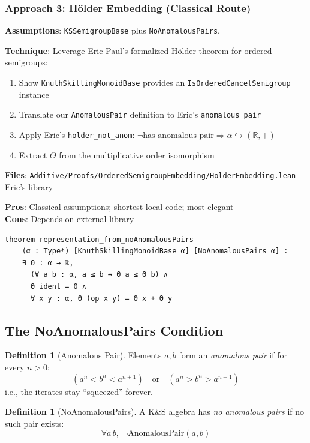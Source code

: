 \documentclass[11pt]{article}
\theoremstyle{definition}
\newtheorem{definition}[theorem]{Definition}
\theoremstyle{remark}
\begin{document}
\subsubsection{Approach 3: H\"older Embedding (Classical Route)}

\textbf{Assumptions}: \texttt{KSSemigroupBase} plus \texttt{NoAnomalousPairs}.

\textbf{Technique}: Leverage Eric Paul's formalized H\"older theorem for ordered semigroups:
\begin{enumerate}
\item Show \texttt{KnuthSkillingMonoidBase} provides an \texttt{IsOrderedCancelSemigroup} instance
\item Translate our \texttt{AnomalousPair} definition to Eric's \texttt{anomalous\_pair}
\item Apply Eric's \texttt{holder\_not\_anom}: $\neg\text{has\_anomalous\_pair} \Rightarrow \alpha \hookrightarrow (\mathbb{R}, +)$
\item Extract $\Theta$ from the multiplicative order isomorphism
\end{enumerate}

\textbf{Files}: \texttt{Additive/Proofs/OrderedSemigroupEmbedding/HolderEmbedding.lean} + Eric's library

\textbf{Pros}: Classical assumptions; shortest local code; most elegant \\
\textbf{Cons}: Depends on external library

\begin{lstlisting}[caption={H\"older-based representation theorem (classical route)}]
theorem representation_from_noAnomalousPairs
    (α : Type*) [KnuthSkillingMonoidBase α] [NoAnomalousPairs α] :
    ∃ Θ : α → ℝ,
      (∀ a b : α, a ≤ b ↔ Θ a ≤ Θ b) ∧
      Θ ident = 0 ∧
      ∀ x y : α, Θ (op x y) = Θ x + Θ y
\end{lstlisting}

\subsection{The NoAnomalousPairs Condition}

\begin{definition}[Anomalous Pair]
Elements $a, b$ form an \emph{anomalous pair} if for every $n > 0$:
\[(a^n < b^n < a^{n+1}) \quad\text{or}\quad (a^n > b^n > a^{n+1})\]
i.e., the iterates stay ``squeezed'' forever.
\end{definition}

\begin{definition}[NoAnomalousPairs]
A K\&S algebra has \emph{no anomalous pairs} if no such pair exists:
\[\forall a\, b,\; \neg\text{AnomalousPair}(a, b)\]
\end{definition}
\end{document}
